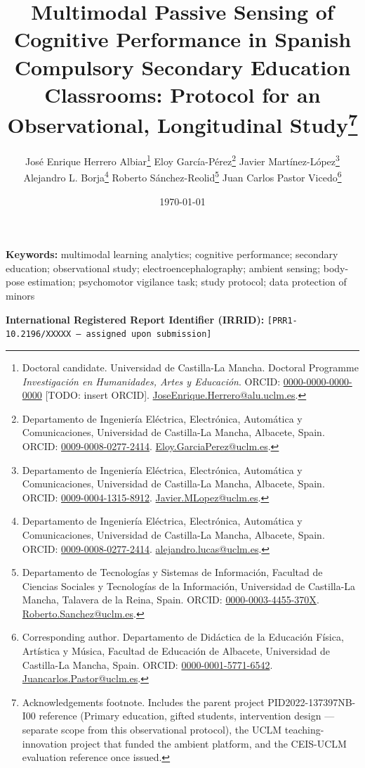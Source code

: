 \documentclass[12pt]{article}
\title{Multimodal Passive Sensing of Cognitive Performance in Spanish Compulsory Secondary Education Classrooms: Protocol for an Observational, Longitudinal Study\thanks{Acknowledgements footnote. Includes the parent project PID2022-137397NB-I00 reference (Primary education, gifted students, intervention design — separate scope from this observational protocol), the UCLM teaching-innovation project that funded the ambient platform, and the CEIS-UCLM evaluation reference once issued.}}
\author{
José Enrique Herrero Albiar\thanks{Doctoral candidate. Universidad de Castilla-La Mancha. Doctoral Programme \emph{Investigación en Humanidades, Artes y Educación}. ORCID: \href{https://orcid.org/0000-0000-0000-0000}{0000-0000-0000-0000} [TODO: insert ORCID]. \href{mailto:JoseEnrique.Herrero@alu.uclm.es}{JoseEnrique.Herrero@alu.uclm.es}.} \quad
Eloy García-Pérez\thanks{Departamento de Ingeniería Eléctrica, Electrónica, Automática y Comunicaciones, Universidad de Castilla-La Mancha, Albacete, Spain. ORCID: \href{https://orcid.org/0009-0008-0277-2414}{0009-0008-0277-2414}. \href{mailto:Eloy.GarciaPerez@uclm.es}{Eloy.GarciaPerez@uclm.es}.} \quad
Javier Martínez-López\thanks{Departamento de Ingeniería Eléctrica, Electrónica, Automática y Comunicaciones, Universidad de Castilla-La Mancha, Albacete, Spain. ORCID: \href{https://orcid.org/0009-0004-1315-8912}{0009-0004-1315-8912}. \href{mailto:Javier.MLopez@uclm.es}{Javier.MLopez@uclm.es}.} \quad
Alejandro L. Borja\thanks{Departamento de Ingeniería Eléctrica, Electrónica, Automática y Comunicaciones, Universidad de Castilla-La Mancha, Albacete, Spain. ORCID: \href{https://orcid.org/0000-0003-2880-0678}{0009-0008-0277-2414}. \href{mailto:alejandro.lucas@uclm.es}{alejandro.lucas@uclm.es}.} \quad
Roberto Sánchez-Reolid\thanks{Departamento de Tecnologías y Sistemas de Información, Facultad de Ciencias Sociales y Tecnologías de la Información, Universidad de Castilla-La Mancha, Talavera de la Reina, Spain. ORCID: \href{https://orcid.org/0000-0003-4455-370X}{0000-0003-4455-370X}. \href{mailto:Roberto.Sanchez@uclm.es}{Roberto.Sanchez@uclm.es}.} \quad
Juan Carlos Pastor Vicedo\thanks{Corresponding author. Departamento de Didáctica de la Educación Física, Artística y Música, Facultad de Educación de Albacete, Universidad de Castilla-La Mancha, Spain. ORCID: \href{https://orcid.org/0000-0001-5771-6542}{0000-0001-5771-6542}. \href{mailto:Juancarlos.Pastor@uclm.es}{Juancarlos.Pastor@uclm.es}.}
}
\date{\today}
\begin{document}
\maketitle
\thispagestyle{empty}



\vspace{1em}
\noindent \textbf{Keywords:} multimodal learning analytics; cognitive performance; secondary education; observational study; electroencephalography; ambient sensing; body-pose estimation; psychomotor vigilance task; study protocol; data protection of minors

\vspace{0.5em}
\noindent \textbf{International Registered Report Identifier (IRRID):} \texttt{[PRR1-10.2196/XXXXX --- assigned upon submission]}

\newpage
\setcounter{page}{1}










\clearpage
\small \printbibliography
\end{document}
